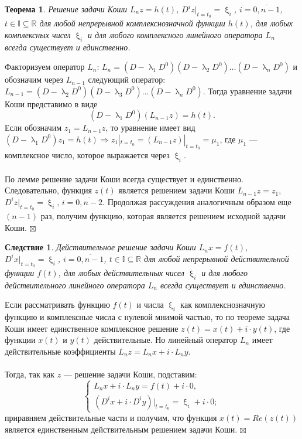 \documentclass[a4paper, 12pt]{report}
\newenvironment{Proof} %
{\par\noindent{$\blacklozenge$}} %
{\hfill$\scriptstyle\boxtimes$}
\renewcommand{\lambda}{\uplambda}
\renewcommand{\xi}{\upxi}
\begin{document}
	\newtheorem*{2_1_2}{Теорема}\begin{2_1_2} Решение задачи Коши $L_nz = h(t)$, $D^iz|_{t=t_0} = \xi_i$, $i=\overline{0,n-1}$, $t\in\mathbb{I}\subseteq\mathbb{R}$ для любой непрерывной комплекснозначной функции $h(t)$, для любых комплексных чисел $\xi_i$ и для любого комплексного линейного оператора $L_n$ всегда существует и единственно.
	\end{2_1_2}\begin{Proof}
		Факторизуем оператор $L_n$: $L_n = (D-\lambda_1D^0)(D-\lambda_2D^0)\ldots(D-\lambda_nD^0)$ и обозначим через $L_{n-1}$ следующий оператор: $L_{n-1} = (D-\lambda_2D^0)(D-\lambda_3D^0)\ldots(D-\lambda_nD^0)$. Тогда уравнение задачи Коши представимо в виде $$(D-\lambda_1D^0)(L_{n-1}z) = h(t).$$
		Если обозначим $z_1=L_{n-1}z$, то уравнение имеет вид $(D - \lambda_1D^0)z_1 = h(t)\Rightarrow z_1|_{t=t_0}=(L_{n-1}z)|_{t=t_0} = \mu_1$, где $\mu_1$ --- комплексное число, которое выражается через $\xi_i$.\\\\
		По лемме решение задачи Коши всегда существует и единственно. Следовательно, функция $z(t)$ является решением задачи Коши $L_{n-1}z = z_1$, $D^iz|_{t=t_0} = \xi_i$, $i=\overline{0,n-2}$. Продолжая рассуждения аналогичным образом еще $(n-1)$ раз, получим функцию, которая является решением исходной задачи Коши.
	\end{Proof}
	\newtheorem*{2_1_3}{Следствие}\begin{2_1_3} Действительное решение задачи Коши $L_nx = f(t)$, $D^ix|_{t=t_0} = \xi_i$, $i=\overline{0,n-1}$, $t\in\mathbb{I}\subseteq\mathbb{R}$ для любой непрерывной действительной функции $f(t)$, для любых действительных чисел $\xi_i$ и для любого действительного линейного оператора $L_n$ всегда существует и единственно.
	\end{2_1_3}\begin{Proof}
		Если рассматривать функцию $f(t)$ и числа $\xi_i$ как комплекснозначную функцию и комплексные числа с нулевой мнимой частью, то по теореме задача Коши имеет единственное комплексное решение $z(t) = x(t) + i\cdot y(t)$, где функции $x(t)$ и $y(t)$ действительные. Но линейный оператор $L_n$ имеет действительные коэффициенты $L_nz = L_nx + i\cdot L_ny$.\\\\
		Тогда, так как $z$ --- решение задачи Коши, подставим: $$\begin{cases}
			L_nx + i\cdot L_ny = f(t) + i\cdot 0,\\
			(D^ix + i\cdot D^iy)|_{t=t_0} = \xi_i + i\cdot 0;
		\end{cases}$$ приравняем действительные части и получим, что функция $x(t) = Re(z(t))$ является единственным действительным решением задачи Коши.
	\end{Proof}
\end{document}
